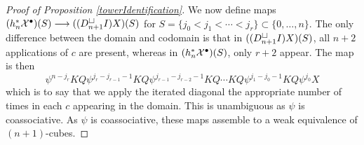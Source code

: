 \documentclass[11pt]{amsart}
\theoremstyle{plain}
\newcommand{\dupdown}[2]{D_{\smash{#1}}}
\begin{document}
\begin{proof}[Proof of Proposition \ref{towerIdentification}]
We now define maps $(h_n^*\mathcal{X}^\bullet)(S)\longrightarrow (({D}_{n+1}^{\smash{\square}}I)X)(S)$ for $S=\{j_0<j_1<\cdots<j_r\}\subset\{0,\ldots,n\}$. 
The only difference between the domain and codomain is that in $(({D}_{n+1}^{\smash{\square}}I)X)(S)$, all $n+2$ applications of $c$ are present, whereas in $(h_n^*\mathcal{X}^\bullet)(S)$, only $r+2$ appear. The map is then
\[\psi^{n-j_r}KQ\psi^{j_r-j_{r-1}-1}KQ\psi^{j_{r-1}-j_{r-2}-1}KQ\cdots KQ\psi^{j_{1}-j_0-1}KQ\psi^{j_0}X\]
which is to say that we apply the iterated diagonal the appropriate number of times in each $c$ appearing in the domain. This is unambiguous as $\psi$ is coassociative. As $\psi$ is coassociative, these maps assemble to a weak equivalence of $(n+1)$-cubes. 
\end{proof}
\end{document}
